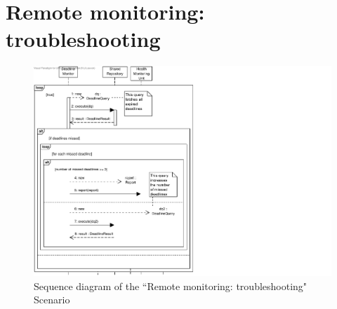\section{Remote monitoring: troubleshooting}
\label{scenario:rm-troubleshooting}

\begin{figure}[H]
	\begin{centering}
		\includegraphics[width=\textwidth]{figs/scenario-5-3-3.pdf}
		\caption{Sequence diagram of the ``Remote monitoring: troubleshooting"
		Scenario}
		\label{fig:scenario-5-3-3}
	\end{centering}
\end{figure}